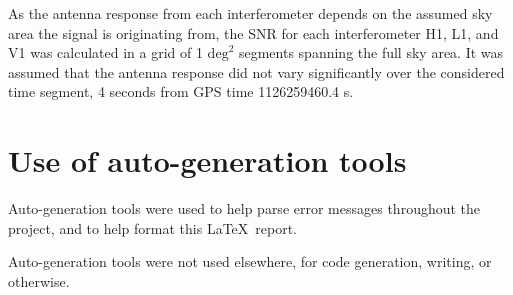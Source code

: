 \documentclass[11pt,a4paper]{article}
\begin{document}
As the antenna response from each interferometer depends on the assumed sky area the signal is originating from, the SNR for each interferometer H1, L1, and V1 was calculated in a grid of 1 $\mathrm{deg}^2$ segments spanning the full sky area. It was assumed that the antenna response did not vary significantly over the considered time segment, 4 seconds from GPS time 1126259460.4 s.



\appendix
\section{Use of auto-generation tools}
Auto-generation tools were used to help parse error messages throughout the project, and to help format this \LaTeX\ report.

Auto-generation tools were not used elsewhere, for code generation, writing, or otherwise.
\end{document}
